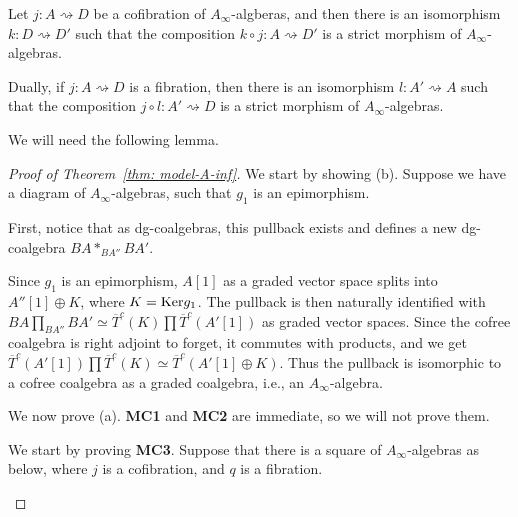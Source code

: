 \documentclass[../thesis.tex]{subfiles}
\begin{document}
        \begin{lemma}\label{lem: strict-replacement}
            Let $j: A \rightsquigarrow D$ be a cofibration of $A_\infty$-algberas, and then there is an isomorphism $k: D\rightsquigarrow D'$ such that the composition $k\circ j: A \rightsquigarrow D'$ is a strict morphism of $A_\infty$-algebras.

            Dually, if $j: A \rightsquigarrow D$ is a fibration, then there is an isomorphism $l: A' \rightsquigarrow A$ such that the composition $j\circ l: A' \rightsquigarrow D$ is a strict morphism of $A_\infty$-algebras.
        \end{lemma}

        We will need the following lemma.

        \begin{proof}[Proof of Theorem~\ref{thm: model-A-inf}]
            We start by showing (b). Suppose we have a diagram of $A_\infty$-algebras, such that $g_1$ is an epimorphism.
            \begin{center}
            \end{center}
            First, notice that as dg-coalgebras, this pullback exists and defines a new dg-coalgebra $BA \ast_{BA''}BA'$.

            Since $g_1$ is an epimorphism, $A[1]$ as a graded vector space splits into $A''[1] \oplus K$, where $K = \tt{Ker}g_1$. The pullback is then naturally identified with $BA \prod_{BA''}BA' \simeq \overline{T}^c(K)\prod \overline{T}^c(A'[1])$ as graded vector spaces. Since the cofree coalgebra is right adjoint to forget, it commutes with products, and we get $\overline{T}^c(A'[1])\prod \overline{T}^c(K) \simeq \overline{T}^c(A'[1]\oplus K)$. Thus the pullback is isomorphic to a cofree coalgebra as a graded coalgebra, i.e., an $A_\infty$-algebra.

            We now prove (a). \textbf{MC1} and \textbf{MC2} are immediate, so we will not prove them.

            We start by proving \textbf{MC3}. Suppose that there is a square of $A_\infty$-algebras as below, where $j$ is a cofibration, and $q$ is a fibration.
            \begin{center}
            \end{center}


\end{proof}
\end{document}
